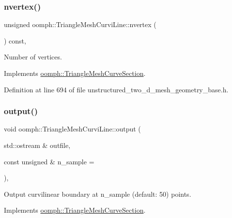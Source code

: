 \subsubsection{\texorpdfstring{nvertex()}{nvertex()}}
{\footnotesize\ttfamily unsigned oomph\+::\+Triangle\+Mesh\+Curvi\+Line\+::nvertex (\begin{DoxyParamCaption}{ }\end{DoxyParamCaption}) const\hspace{0.3cm}{\ttfamily [inline]}, {\ttfamily [virtual]}}



Number of vertices. 



Implements \hyperlink{classoomph_1_1TriangleMeshCurveSection_a491d849e8147152c10d55c8ca6c3d63d}{oomph\+::\+Triangle\+Mesh\+Curve\+Section}.



Definition at line 694 of file unstructured\+\_\+two\+\_\+d\+\_\+mesh\+\_\+geometry\+\_\+base.\+h.

\mbox{\label{classoomph_1_1TriangleMeshCurviLine_a4432e3848032cc78bc3282149c4d6cff}} 
\subsubsection{\texorpdfstring{output()}{output()}}
{\footnotesize\ttfamily void oomph\+::\+Triangle\+Mesh\+Curvi\+Line\+::output (\begin{DoxyParamCaption}\item[{std\+::ostream \&}]{outfile,  }\item[{const unsigned \&}]{n\+\_\+sample = {} }\end{DoxyParamCaption})\hspace{0.3cm}{\ttfamily [inline]}, {\ttfamily [virtual]}}



Output curvilinear boundary at n\+\_\+sample (default\+: 50) points. 



Implements \hyperlink{classoomph_1_1TriangleMeshCurveSection_a140b0bb85d7bf85cc025e19e996d5c53}{oomph\+::\+Triangle\+Mesh\+Curve\+Section}.



